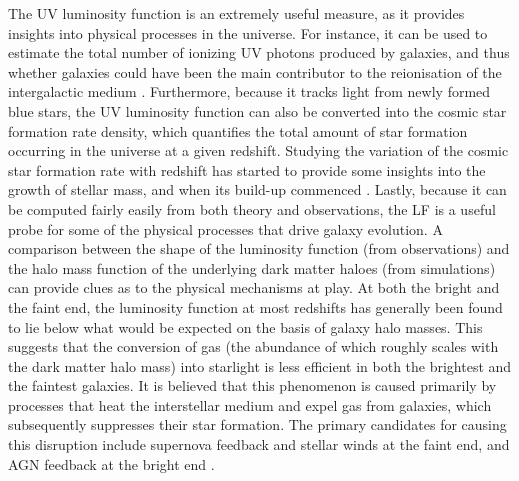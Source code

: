 The UV luminosity function is an extremely useful measure, as it provides insights into physical processes in the universe. For instance, it can be used to estimate the total number of ionizing UV photons produced by galaxies, and thus whether galaxies could have been the main contributor to the reionisation of the intergalactic medium \citep{2010Natur.468...49R,2013ApJ...768...71R}. Furthermore, because it tracks light from newly formed blue stars, the UV luminosity function can also be converted into the cosmic star formation rate density, which quantifies the total amount of star formation occurring in the universe at a given redshift. Studying the variation of the cosmic star formation rate with redshift has started to provide some insights into the growth of stellar mass, and when its build-up commenced \citep{2013ApJ...763L...7E,2014ARA&A..52..415M,2015ApJ...803...34B,2015ApJ...810...71F}. Lastly, because it can be computed fairly easily from both theory and observations, the LF is a useful probe for some of the physical processes that drive galaxy evolution.  A comparison between the shape of the luminosity function (from observations) and the halo mass function of the underlying dark matter haloes (from simulations) can provide clues as to the physical mechanisms at play. At both the bright and the faint end, the luminosity function at most redshifts has generally been found to lie below what would be expected on the basis of galaxy halo masses. This suggests that the conversion of gas (the abundance of which roughly scales with the dark matter halo mass) into starlight is less efficient in both the brightest and the faintest galaxies. It is believed that this phenomenon is caused primarily by processes that heat the interstellar medium and expel gas from galaxies, which subsequently suppresses their star formation. The primary candidates for causing this disruption include supernova feedback and stellar winds at the faint end, and AGN feedback at the bright end \citep{2003ApJ...599...38B,2008MNRAS.391..481S,2015ARA&A..53...51S}.  \par


